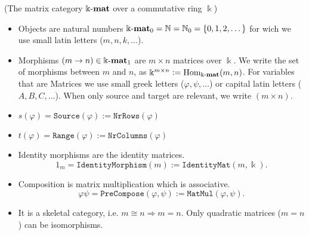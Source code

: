 \begin{example}{(The matrix category $\Bbbk\textnormal{-}\mathbf{mat}$ over a commutative ring $\Bbbk$)}\label{ex:kmat_skeletal}
\begin{itemize}
\item Objects are natural numbers $\Bbbk\textnormal{-}\mathbf{mat}_{0} = \mathbb{N} = \mathbb{N}_{0} = \{0,1,2,\dots\}$ for wich we use small latin letters
($m, n, k,\dots$).
\item Morphisms $(m \rightarrow n) \in \Bbbk\textnormal{-}\mathbf{mat}_{1}$ are $m \times n$ matrices over $\Bbbk$.
We write the set of morphisms between $m$ and $n$, as $\Bbbk^{m\times n} := \textup{Hom}_{\Bbbk\textnormal{-}\mathbf{mat}}(m,n)$. 
For variables that are Matrices we use small greek letters ($\varphi, \psi,\dots$) or capital latin letters ($A, B, C,\dots$). When only source and target are relevant,
we write $(m \times n)$.
\item $s(\varphi) = \mathtt{Source}(\varphi) := \mathtt{NrRows}(\varphi)$
\item $t(\varphi) = \mathtt{Range}(\varphi) := \mathtt{NrColumns}(\varphi)$
\item Identity morphisms are the identity matrices.
\[
1_{m} = \mathtt{IdentityMorphism}(m) := \mathtt{IdentityMat}(m,\Bbbk).
\]
\item Composition is matrix multiplication which is associative.
\[
\varphi\psi = \mathtt{PreCompose}(\varphi,\psi) := \mathtt{MatMul}(\varphi,\psi).
\]
\item It is a skeletal category, i.e. $m \cong n \Rightarrow m = n$. Only quadratic matrices ($m = n$) can be
isomorphisms.
\end{itemize}
\end{example}

